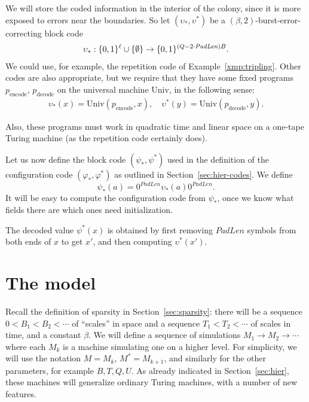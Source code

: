 \documentclass[12pt]{memoir}
\def\B{B}
\def\U{U}
\newcommand{\Tu}{T}
\newcommand{\decode}{\mathrm{decode}}
\newcommand{\encode}{\mathrm{encode}}
\newcommand{\PadLen}{\mathit{PadLen}}
\newcommand{\Un}{\mathrm{Univ}}
\begin{document}
We will store the coded information in the interior of the colony, since it is more exposed 
to errors near the boundaries.
So let \( (\upsilon_{*}, \upsilon^{*}) \) be a \( (\beta,2) \)-burst-error-correcting block code
\begin{align*}
  \upsilon_{*}: \{0,1\}^{\ell} \cup \set{\emptyset}
   \to\{0,1\}^{(Q-2\cdot\PadLen)\B}.
\end{align*}
We could use, for example, the repetition code of Example~\ref{xmp:tripling}.
Other codes are also appropriate, but we require that they have some fixed
programs \( p_{\encode} \), \( p_{\decode} \)
on the universal machine \( \Un \), in the following sense:
 \begin{align*}
   \upsilon_{*}(x)=\Un(p_{\encode},x),\quad
   \upsilon^{*}(y)=\Un(p_{\decode}, y).
 \end{align*}

Also, these programs must work in quadratic time and linear space on a one-tape
Turing machine (as the repetition code certainly does).

Let us now define the block code \( (\psi_*, \psi^*) \) used in the
definition of the configuration code \( (\varphi_*, \varphi^*) \) as 
outlined in Section~\ref{sec:hier-codes}.
We define
\begin{equation}\label{eq:psi}
   \psi_*(a)  = 0^{\PadLen}\upsilon_{*}(a)0^{\PadLen}.
\end{equation}
It will be easy to compute the configuration code from \( \psi_{*} \),
once we know what fields there are which ones need initialization.

The decoded value \( \psi^{*}(x) \) is obtained by first removing \( \PadLen \)
symbols from both ends of \( x \) to get \( x' \), and then computing \(
\upsilon^{*}(x') \).


\section{The model}\label{sec:model}

Recall the definition of sparsity in Section~\ref{sec:sparsity}: there will be 
a sequence \( 0<\B_{1}<\B_{2}<\dotsm \) of ``scales'' in space and a sequence
\( \Tu_{1}<\Tu_{2}<\dotsm \) of scales in time, and a constant \( \beta \).
We will define a sequence of simulations \( M_{1}\to M_{2}\to\dotsm \) where
each \( M_{k} \) is a machine simulating one on a higher level.
For simplicity, we will use the notation \( M=M_{k} \), \( M^{*}=M_{k+1} \),
and similarly for the other parameters, for example \( \B,\Tu, Q, \U \).
As already indicated in Section~\ref{sec:hier}, these machines will generalize
ordinary Turing machines, with a number of new features.
\end{document}
